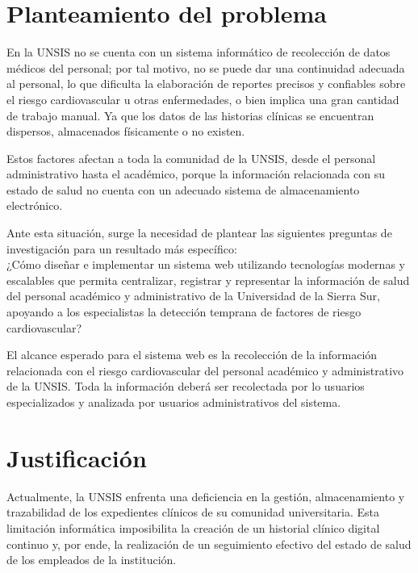 \section{Planteamiento del problema}
    En la UNSIS no se cuenta con un sistema informático de recolección de datos médicos del personal; por tal motivo, no se puede dar una continuidad adecuada al personal, lo que dificulta la elaboración de reportes precisos y confiables sobre el riesgo cardiovascular u otras enfermedades, o bien implica una gran cantidad de trabajo manual. Ya que los datos de las historias clínicas se encuentran dispersos, almacenados físicamente o no existen.
    
    Estos factores afectan a toda la comunidad de la UNSIS, desde el personal administrativo hasta el académico, porque la información relacionada con su estado de salud no cuenta con un adecuado sistema de almacenamiento electrónico.
    
    Ante esta situación, surge la necesidad de plantear las siguientes preguntas de investigación para un resultado más específico: \\[4pt]
   ¿Cómo diseñar e implementar un sistema web utilizando tecnologías modernas y escalables que permita centralizar, registrar y representar la información de salud del personal académico y administrativo de la Universidad de la Sierra Sur, apoyando a los especialistas la detección temprana de factores de riesgo cardiovascular?
    
    
    El alcance esperado para el sistema web es la recolección de la información relacionada con el riesgo cardiovascular del personal académico y administrativo de la UNSIS. Toda la información deberá ser recolectada por lo usuarios especializados y analizada por usuarios administrativos del sistema.


\section{Justificación}
    Actualmente, la UNSIS enfrenta una deficiencia en la gestión, almacenamiento y trazabilidad de los expedientes clínicos de su comunidad universitaria. Esta limitación informática imposibilita la creación de un historial clínico digital continuo y, por ende, la realización de un seguimiento efectivo del estado de salud de los empleados de la institución.

